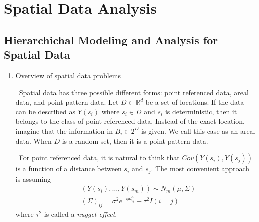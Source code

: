 \section{Spatial Data Analysis}

\subsection{Hierarchichal Modeling and Analysis for Spatial Data\cite{banerjee2015}}

\begin{enumerate}
    \item Overview of spatial data problems
    
    \ Spatial data has three possible different forms: 
    point referenced data, areal data, and point pattern data.
    Let $D \subset \mathbb{R}^d$ be a set of locations.
    If the data can be described as $Y(s_i)$ where $s_i \in D$ and $s_i$ is deterministic,
    then it belongs to the class of point referenced data.
    Instead of the exact location, imagine that the information in $B_i \in 2^D$ is given.
    We call this case as an areal data.
    When $D$ is a random set, then it is a point pattern data.

    \ For point referenced data, it is natural to think that $Cov\left ( Y(s_i), Y(s_j) \right )$ 
    is a function of a distance between $s_i$ and $s_j$.
    The most convenient approach is assuming
    \[
        \begin{split}
            &(Y(s_i), \dots, Y(s_m)) \sim N_m \left ( \mu, \Sigma \right )\\
            &(\Sigma)_{ij} = \sigma^2 e^{-\phi d_{ij}^\kappa} + \tau^2 I(i=j)
        \end{split}
    \]
    where $\tau^2$ is called a \emph{nugget effect}.
\end{enumerate}